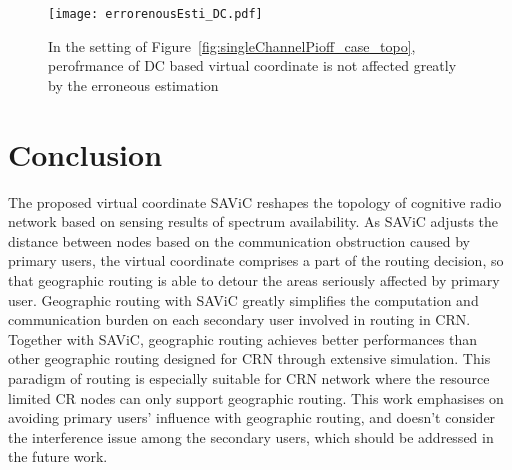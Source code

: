 \begin{figure}[ht]
	\centering
    \texttt{[image: errorenousEsti\_DC.pdf]}
    \caption{In the setting of Figure~\ref{fig:singleChannelPioff_case_topo}, perofrmance of DC based virtual coordinate is not affected greatly by the erroneous estimation} 			\label{fig:errorenousEsti_DC}
\end{figure}




\section{Conclusion}
The proposed virtual coordinate SAViC reshapes the topology of cognitive radio network based on sensing results of spectrum availability.
As SAViC adjusts the distance between nodes based on the communication obstruction caused by primary users, the virtual coordinate comprises a part of the routing decision, so that geographic routing is able to detour the areas seriously affected by primary user.
Geographic routing with SAViC greatly simplifies the computation and communication burden on each secondary user involved in routing in CRN.
Together with SAViC, geographic routing achieves better performances than other geographic routing designed for CRN through extensive simulation.
This paradigm of routing is especially suitable for CRN network where the resource limited CR nodes can only support geographic routing.
This work emphasises on avoiding primary users' influence with geographic routing, and doesn't consider the interference issue among the secondary users, which should be addressed in the future work.
%
